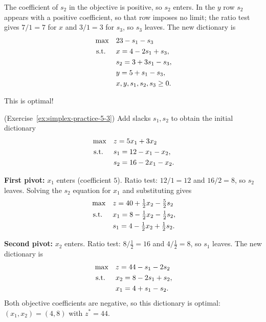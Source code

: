 \begin{solution}
The coefficient of \(s_2\) in the objective is positive, so \(s_2\) enters. In the \(y\) row \(s_2\) appears with a positive coefficient, so that row imposes no limit; the ratio test gives \(7/1 = 7\) for \(x\) and \(3/1 = 3\) for \(s_3\), so \(s_3\) leaves. The new dictionary is
\[
\begin{aligned}
\max\quad & 23 - s_1 - s_3 \\
\text{ s.t. }\quad & x = 4 - 2s_1 + s_3, \\
                        & s_2 = 3 + 3s_1 - s_3, \\
                        & y = 5 + s_1 - s_3, \\
                        & x, y, s_1, s_2, s_3 \ge 0.
\end{aligned}
\]

This is optimal!

\end{solution}

\begin{solution}(Exercise~\ref{ex:simplex-practice-5-3})
Add slacks $s_1, s_2$ to obtain the initial dictionary
\[
\begin{aligned}
\max\quad & z = 5x_1 + 3x_2 \\
\text{ s.t. }\quad & s_1 = 12 - x_1 - x_2, \\
         & s_2 = 16 - 2x_1 - x_2.
\end{aligned}
\]

\textbf{First pivot:} $x_1$ enters (coefficient $5$).  Ratio test: $12/1 = 12$ and $16/2 = 8$, so $s_2$ leaves.  Solving the $s_2$ equation for $x_1$ and substituting gives
\[
\begin{aligned}
\max\quad & z = 40 + \tfrac12 x_2 - \tfrac52 s_2 \\
\text{ s.t. }\quad & x_1 = 8 - \tfrac12 x_2 - \tfrac12 s_2, \\
         & s_1 = 4 - \tfrac12 x_2 + \tfrac12 s_2.
\end{aligned}
\]

\textbf{Second pivot:} $x_2$ enters.  Ratio test: $8/\tfrac12 = 16$ and $4/\tfrac12 = 8$, so $s_1$ leaves.  The new dictionary is
\[
\begin{aligned}
\max\quad & z = 44 - s_1 - 2s_2 \\
\text{ s.t. }\quad & x_2 = 8 - 2s_1 + s_2, \\
         & x_1 = 4 + s_1 - s_2.
\end{aligned}
\]
Both objective coefficients are negative, so this dictionary is optimal: $(x_1, x_2) = (4, 8)$ with $z^* = 44$.
\end{solution}
\vspace{1cm}

